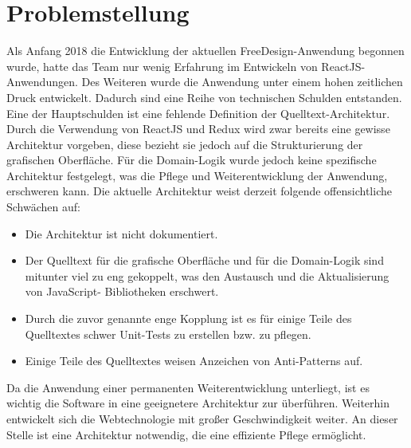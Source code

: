\section{Problemstellung}
Als Anfang 2018 die Entwicklung der aktuellen FreeDesign-Anwendung begonnen wurde, hatte das Team nur wenig Erfahrung im Entwickeln von ReactJS-Anwendungen. Des Weiteren wurde die Anwendung unter einem hohen zeitlichen Druck entwickelt.
Dadurch sind eine Reihe von technischen Schulden entstanden. Eine der Hauptschulden ist eine fehlende Definition der Quelltext-Architektur. Durch die Verwendung von ReactJS und Redux wird zwar bereits eine gewisse Architektur vorgeben, diese bezieht sie jedoch auf die Strukturierung der grafischen Oberfläche. Für die Domain-Logik wurde jedoch keine spezifische Architektur festgelegt, was die Pflege und Weiterentwicklung der Anwendung, erschweren kann.
Die aktuelle Architektur weist derzeit folgende offensichtliche Schwächen auf:
\begin{itemize}
  \item Die Architektur ist nicht dokumentiert.
  \item Der Quelltext für die grafische Oberfläche und für die Domain-Logik sind mitunter viel
  zu eng gekoppelt, was den Austausch und die Aktualisierung von JavaScript-
  Bibliotheken erschwert.
  \item Durch die zuvor genannte enge Kopplung ist es für einige Teile des Quelltextes
  schwer Unit-Tests zu erstellen bzw. zu pflegen.
  \item Einige Teile des Quelltextes weisen Anzeichen von Anti-Patterns auf.
\end{itemize}
Da die Anwendung einer permanenten Weiterentwicklung unterliegt, ist es wichtig die Software in eine geeignetere Architektur zur überführen. Weiterhin entwickelt sich die Webtechnologie mit großer Geschwindigkeit weiter. An dieser Stelle ist eine Architektur notwendig, die eine effiziente Pflege ermöglicht.

